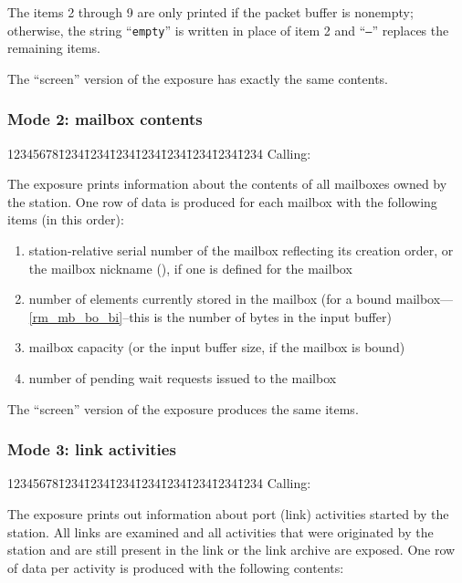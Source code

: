The items 2 through 9 are only printed if the packet buffer is nonempty;
otherwise, the string ``{\tt empty}'' is written in place of item 2 and
``{\tt ---}'' replaces the remaining items.

The ``screen'' version of the exposure has exactly the same contents.

\subsubsection*{Mode 2: mailbox contents}

{\tt\begin{tabbing}
12345678\=1234\=1234\=1234\=1234\=1234\=1234\=1234\=1234\kill
{\rm Calling:}
\end{tabbing}}

The exposure prints information about the contents of all
mailboxes owned by the station.
One row of data is produced for each mailbox with the following items
(in this order):

\begin{enumerate}
\item
station-relative serial number of the mailbox reflecting its creation
order, or the mailbox nickname (), if one is defined for the
mailbox
\item
number of elements currently stored in the mailbox
(for a bound mailbox---\ref{rm_mb_bo_bi}--this is 
the number of bytes in the input buffer)
\item
mailbox capacity (or the input buffer size, if the mailbox is bound)
\item
number of pending wait requests issued to the mailbox
\end{enumerate}

The ``screen'' version of the exposure produces the same items.

\subsubsection*{Mode 3: link activities}

{\tt\begin{tabbing}
12345678\=1234\=1234\=1234\=1234\=1234\=1234\=1234\=1234\kill
{\rm Calling:}
\end{tabbing}}

The exposure prints out information about port (link) activities started
by the station.
All links are examined and all activities that were originated by the station
and are still present in the link or the link archive are exposed.
One row of data per activity is produced with the following contents:

